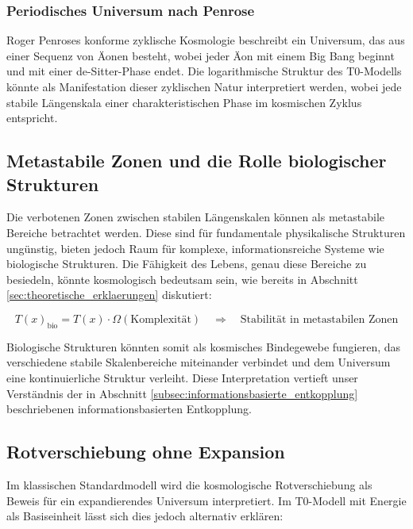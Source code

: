 \documentclass[12pt,a4paper]{article}
\newcommand{\Tfield}{T(x)}
\begin{document}
	\subsubsection{Periodisches Universum nach Penrose}
	\label{subsubsec:penrose}
	
	Roger Penroses konforme zyklische Kosmologie \cite{penrose2010} beschreibt ein Universum, das aus einer Sequenz von Äonen besteht, wobei jeder Äon mit einem Big Bang beginnt und mit einer de-Sitter-Phase endet. Die logarithmische Struktur des T0-Modells könnte als Manifestation dieser zyklischen Natur interpretiert werden, wobei jede stabile Längen\-skala einer charakteristischen Phase im kosmischen Zyklus entspricht.
	
	\subsection{Metastabile Zonen und die Rolle biologischer Strukturen}
	\label{subsec:metastabile_zonen}
	
	Die \glqq verbotenen Zonen\grqq{} zwischen stabilen Längen\-skalen können als metastabile Bereiche betrachtet werden. Diese sind für fundamentale physikalische Strukturen ungünstig, bieten jedoch Raum für komplexe, informationsreiche Systeme wie biologische Strukturen. Die Fähigkeit des Lebens, genau diese Bereiche zu besiedeln, könnte kosmologisch bedeutsam sein, wie bereits in Abschnitt \ref{sec:theoretische_erklaerungen} diskutiert:
	
	\begin{equation}
		\label{eq:biostabilisierung}
		\Tfield_{\text{bio}} = \Tfield \cdot \Omega(\text{Komplexität}) \quad \Rightarrow \quad \text{Stabilität in metastabilen Zonen}
	\end{equation}
	
	Biologische Strukturen könnten somit als \glqq kosmisches Bindegewebe\grqq{} fungieren, das verschiedene stabile Skalenbereiche miteinander verbindet und dem Universum eine kontinuierliche Struktur verleiht. Diese Interpretation vertieft unser Verständnis der in Abschnitt \ref{subsec:informationsbasierte_entkopplung} beschriebenen informationsbasierten Entkopplung.
	
	\subsection{Rotverschiebung ohne Expansion}
	\label{subsec:rotverschiebung}
	
	Im klassischen Standardmodell wird die kosmologische Rotverschiebung als Beweis für ein expandierendes Universum interpretiert. Im T0-Modell mit Energie als Basis\-einheit lässt sich dies jedoch alternativ erklären:
	
\end{document}
